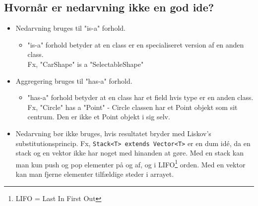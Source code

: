 \subsection{Hvornår er nedarvning ikke en god ide?}

\begin{itemize}
  \item Nedarvning bruges til "is-a" forhold.
  \begin{itemize}
    \item "is-a" forhold betyder at en class er en specialiseret version af en anden class. \\
Fx, "CarShape" is a "SelectableShape"
  \end{itemize}
  
  \item Aggregering bruges til "has-a" forhold.
  \begin{itemize}
    \item "has-a" forhold betyder at en class har et field hvis type er en anden class. \\
Fx, "Circle" has a "Point" - Circle classen har et Point objekt som sit centrum. Den er ikke et Point objekt i sig selv.
  \end{itemize}
  
  \item Nedarvning bør ikke bruges, hvis resultatet bryder med Liskov's substitutionsprincip.
Fx, \verb|Stack<T> extends Vector<T>| er en dum idé, da en stack og en vektor ikke har
noget med hinanden at gøre. Med en stack kan man kun push og pop elementer på
og af, og i LIFO\footnote{LIFO = Last In First Out} orden. Med en vektor kan man fjerne elementer tilfældige steder i arrayet.
\end{itemize}


